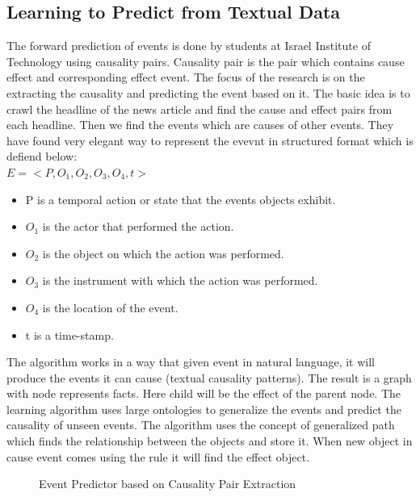 \documentclass[journal,onecolumn,11pt]{IEEEtran}
\begin{document}
\subsection{Learning to Predict from Textual Data}
The forward prediction of events is done by students at Israel Institute of Technology using causality pairs\cite{paper1}. Causality pair is the pair which contains cause effect and corresponding effect event. The focus of the research is on the extracting the causality and predicting the event based on it. The basic idea is to crawl the headline of the news article and find the cause and effect pairs from each headline. Then we find the events which are causes of other 
events. They have found very elegant way to represent the evevnt in structured format which is defiend below: \\ $E = < P, O_1, O_2, O_3, O_4,t >$
\begin{itemize}
    \item P is a temporal action or state that the events objects exhibit.
    \item $O_1$ is the actor that performed the action.
    \item $O_2$ is the object on which the action was performed.
    \item 	$O_3$ is the instrument with which the action was performed.
    \item $O_4$ is the location of the event.
    \item 	t is a time-stamp.
\end{itemize}



The algorithm works in a way that given event in natural language, it will produce the events it can cause (textual causality patterns). The result is a graph with node represents facts. Here child will be the effect of the parent node.  The learning algorithm uses large ontologies to generalize the events and predict the causality of unseen events. The algorithm uses the concept of generalized path which finds the relationship between the objects and store it.
When new object in cause event comes using the rule it will find the effect object.

\begin{figure}[h!]
    \centering
    \def\svgwidth{\columnwidth}
    
    
    \caption{Event Predictor based on Causality Pair Extraction}
  
\end{figure}
\end{document}
